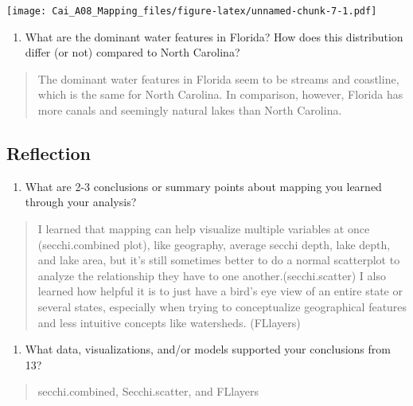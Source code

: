 \documentclass[]{article}
\providecommand{\tightlist}{%
  \setlength{\itemsep}{0pt}\setlength{\parskip}{0pt}}
\begin{document}
\texttt{[image: Cai\_A08\_Mapping\_files/figure-latex/unnamed-chunk-7-1.pdf]}

\begin{enumerate}
\def\labelenumi{\arabic{enumi}.}
\setcounter{enumi}{11}
\tightlist
\item
  What are the dominant water features in Florida? How does this
  distribution differ (or not) compared to North Carolina?
\end{enumerate}

\begin{quote}
The dominant water features in Florida seem to be streams and coastline,
which is the same for North Carolina. In comparison, however, Florida
has more canals and seemingly natural lakes than North Carolina.
\end{quote}

\hypertarget{reflection}{%
\subsection{Reflection}\label{reflection}}

\begin{enumerate}
\def\labelenumi{\arabic{enumi}.}
\setcounter{enumi}{12}
\tightlist
\item
  What are 2-3 conclusions or summary points about mapping you learned
  through your analysis?
\end{enumerate}

\begin{quote}
I learned that mapping can help visualize multiple variables at once
(secchi.combined plot), like geography, average secchi depth, lake
depth, and lake area, but it's still sometimes better to do a normal
scatterplot to analyze the relationship they have to one
another.(secchi.scatter) I also learned how helpful it is to just have a
bird's eye view of an entire state or several states, especially when
trying to conceptualize geographical features and less intuitive
concepts like watersheds. (FLlayers)
\end{quote}

\begin{enumerate}
\def\labelenumi{\arabic{enumi}.}
\setcounter{enumi}{13}
\tightlist
\item
  What data, visualizations, and/or models supported your conclusions
  from 13?
\end{enumerate}

\begin{quote}
secchi.combined, Secchi.scatter, and FLlayers
\end{quote}
\end{document}

